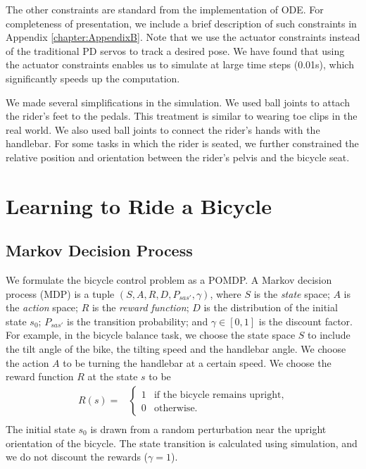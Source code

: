 The other constraints are standard from the implementation of ODE. For completeness of presentation, we include a brief description of such constraints in Appendix \ref{chapter:AppendixB}. Note that we use the actuator constraints instead of the traditional PD servos to track a desired pose. We have found that using the actuator constraints enables us to simulate at large time steps (0.01s), which significantly speeds up the computation.

We made several simplifications in the simulation. We used ball joints to attach the rider's feet to the pedals. This treatment is similar to wearing toe clips in the real world. We also used ball joints to connect the rider's hands with the handlebar. For some tasks in which the rider is seated, we further constrained the relative position and orientation between the rider's pelvis and the bicycle seat.


\section{Learning to Ride a Bicycle}
\label{sec:control}

\subsection{Markov Decision Process}
We formulate the bicycle control problem as a POMDP. A Markov decision process (MDP) is a tuple $(S, A, R, D, P_{sas'}, \gamma)$, where $S$ is the \emph{state} space; $A$ is the \emph{action} space; $R$ is the \emph{reward function}; $D$ is the distribution of the initial state $s_0$; $P_{sas'}$ is the transition probability; and $\gamma \in [0, 1]$ is the discount factor. For example, in the bicycle balance task, we choose the state space $S$ to include the tilt angle of the bike, the tilting speed and the handlebar angle. We choose the action $A$ to be turning the handlebar at a certain speed. We choose the reward function $R$ at the state $s$ to be
\begin{equation}
\begin{array}{ll}
R(s) = & \left\{ \begin{array}{ll}
1 & \textrm{if the bicycle remains upright,}\\
0 & \textrm{otherwise.}
\end{array} \right. \\
\end{array}
\label{eq:balanceReward}
\end{equation}
The initial state $s_0$ is drawn from a random perturbation near the upright orientation of the bicycle. The state transition is calculated using simulation, and we do not discount the rewards ($\gamma = 1$).

